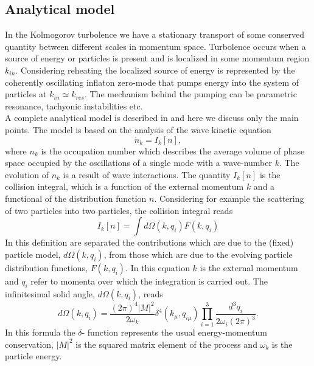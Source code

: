 \documentclass[11pt,a4paper,twoside]{book}
\begin{document}
\subsection{Analytical model}
In the Kolmogorov turbolence we have a stationary transport of some conserved quantity between different scales in momentum space. Turbolence occurs when a source of energy or particles is present and is localized in some momentum region $ k_{in} $. Considering reheating the localized source of energy is represented by the coherently oscillating inflaton zero-mode that pumps energy into the system of particles at $ k_{in}\simeq k_{res} $. The mechanism behind the pumping can be parametric resonance, tachyonic instabilities etc.\\
A complete analytical model is described in \cite{Chap6:TurbolentThermalitation} and here we discuss only the main points. The model is based on the analysis of the wave kinetic equation
\begin{equation}
\label{Chap6:waveKineticEquation}
\dot{n}_{k}=I_{k}[n],
\end{equation}
where $ n_{k} $ is the occupation number which describes the average volume of phase space occupied  by the oscillations of a single mode with a wave-number $ k $. The evolution of $ n_{k} $ is a result of wave interactions. The quantity $ I_{k}[n] $ is the collision integral, which is a function of the external momentum $ k $ and a functional of the distribution function $ n $. Considering for example the scattering of two particles into two particles, the collision integral reads
\begin{equation}
\label{Chap6:ColisionIntegral}
I_{k}[n] = \int d\Omega(k,q_{i})F(k,q_{i})
\end{equation}
In this definition are separated the contributions which are due to the (fixed) particle model, $ d\Omega(k,q_{i}) $, from those which are due to the evolving particle distribution functions, $ F(k,q_{i}) $. In this equation $ k $ is the external momentum and $ q_{i} $ refer to momenta over which the integration is carried out. The infinitesimal solid angle, $ d\Omega(k,q_{i}) $, reads
\begin{equation}
\label{Chap6:solidAngle}
d\Omega(k,q_{i}) = \frac{(2\pi)^{4}|M|^{2}}{2\omega_{k}}\delta^{4}(k_{\mu},q_{i\mu})\prod_{i=1}^{3}\frac{d^{3}q_{i}}{2\omega_{i}(2\pi)^{3}}.
\end{equation}
In this formula the $ \delta $- function represents the usual energy-momentum conservation, $ |M|^{2} $ is the squared matrix element of the process and $\omega_{k}$ is the particle energy.
\end{document}
